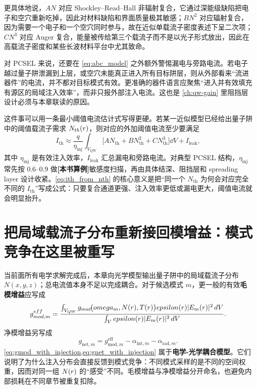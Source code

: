 更具体地说，$AN$ 对应 Shockley--Read--Hall 非辐射复合，它通过深能级缺陷把电子和空穴重新吃掉，因此对材料缺陷和界面质量极其敏感；$BN^2$ 对应辐射复合，因为需要一个电子和一个空穴同时参与，故在近似单载流子密度表述下呈二次项；$CN^3$ 对应 Auger 复合，能量被传给第三个载流子而不是以光子形式放出，因此在高载流子密度和某些长波材料平台中尤其致命。

对 PCSEL 来说，还要在 \cref{eq:abc_model} 之外额外警惕漏电与旁路电流。若电子越过量子阱泄漏到上层，或空穴未能真正进入所有目标阱层，则从外部看来“流进器件”的电流，并不都对目标模式有效。更准确的器件语言应聚焦“进入并有效填充有源区的局域注入效率”，而非只报外部注入电流。这也是 \cref{ch:qw-gain} 里阻挡层设计必须与本章联读的原因。

这件事可以用一条最小阈值电流估计式写得更硬。若某一近似模型已经给出量子阱中的阈值载流子需求 $N_{th}(r)$，则对应的外加阈值电流至少要满足
\begin{equation}
I_{\mathrm{th}}
\approx
\frac{q}{\eta_{\mathrm{inj}}}
\int_{V_{\mathrm{QW}}}
\bigl[A N_{\mathrm{th}} + B N_{\mathrm{th}}^2 + C N_{\mathrm{th}}^3\bigr]\dd V
+
I_{\mathrm{leak}},
\label{eq:ith_from_nth}
\end{equation}
其中 $\eta_{\mathrm{inj}}$ 是有效注入效率，$I_{\mathrm{leak}}$ 汇总漏电和旁路电流。对典型 PCSEL 结构，$\eta_{\mathrm{inj}}$ 常先按 $0.6$--$0.9$ 做\textbf{[本书算例]}敏感度扫描，再由具体结深、阻挡层和 spreading layer 设计收紧。\cref{eq:ith_from_nth} 的核心意义是把“同一个 $N_{\mathrm{th}}$ 为何会对应完全不同的 $I_{\mathrm{th}}$”写成公式：只要复合通道更强、注入效率更低或漏电更大，阈值电流就会明显抬升。

\section{把局域载流子分布重新接回模增益：模式竞争在这里被重写}
当前面所有电学求解完成后，本章向光学模型输出量子阱中的局域载流子分布 $N(x,y,z)$；总电流值本身不足以完成耦合。对于候选模式 $m$，更一般的有效\textbf{毛模增益}应写成
\begin{equation}
 g_{mod,m}^{eff}
 =
 \frac{\int_{V_{QW}} g_{mat}\!\bigl(omega_m,N(r),T(r)\bigr)
 epsilon(r)|E_m(r)|^2\,d V}
 {\int_V epsilon(r)|E_m(r)|^2\,d V}.
\label{eq:gmod_with_injection}
\end{equation}
净模增益另写成
\begin{equation}
g_{\mathrm{net},m}
=g_{\mathrm{mod},m}^{\mathrm{eff}}
-\alpha_{\mathrm{int},m}-\alpha_{\mathrm{rad},m}.
\label{eq:gnet_with_injection}
\end{equation}
\cref{eq:gmod_with_injection,eq:gnet_with_injection} 属于\textbf{电学-光学耦合模型}。它们说明了为什么注入分布会直接反馈到模式竞争：不同模式采样的是不同的空间权重，因而对同一组 $N(r)$ 的“感受”不同。毛模增益与净模增益分开命名，也避免内部损耗在不同章节被重复扣除。

